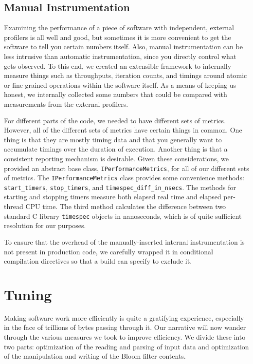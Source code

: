 \documentclass{article}
\begin{document}
\subsection{Manual Instrumentation}

Examining the performance of a piece of software with independent, external profilers is all well and good, but sometimes it is more convenient to get the software to tell you certain numbers itself. Also, manual instrumentation can be less intrusive than automatic instrumentation, since you directly control what gets observed. To this end, we created an extensible framework to internally measure things such as throughputs, iteration counts, and timings around atomic or fine-grained operations within the software itself. As a means of keeping us honest, we internally collected some numbers that could be compared with measurements from the external profilers.

For different parts of the code, we needed to have different sets of metrics. However, all of the different sets of metrics have certain things in common. One thing is that they are mostly timing data and that you generally want to accumulate timings over the duration of execution. Another thing is that a consistent reporting mechanism is desirable. Given these considerations, we provided an abstract base class, \texttt{IPerformanceMetrics}, for all of our different sets of metrics. The \texttt{IPerformanceMetrics} class provides some convenience methods: \texttt{start\_timers}, \texttt{stop\_timers}, and \texttt{timespec\_diff\_in\_nsecs}. The methods for starting and stopping timers measure both elapsed real time and elapsed per-thread CPU time. The third method calculates the difference between two standard C library \texttt{timespec} objects in nanoseconds, which is of quite sufficient resolution for our purposes.

To ensure that the overhead of the manually-inserted internal instrumentation is not present in production code, we carefully wrapped it in conditional compilation directives so that a build can specify to exclude it.

\section{Tuning}

Making software work more efficiently is quite a gratifying experience, especially in the face of trillions of bytes passing through it. Our narrative will now wander through the various measures we took to improve efficiency. We divide these into two parts: optimization of the reading and parsing of input data and optimization of the manipulation and writing of the Bloom filter contents.
\end{document}
